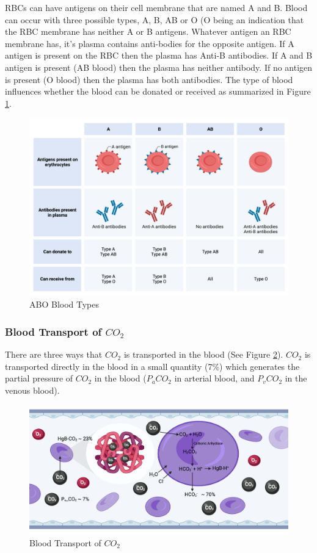 RBCs can have antigens on their cell membrane that are named A and B. Blood can occur with three possible types, A, B, AB or O (O being an indication that the RBC membrane has neither A or B antigens. Whatever antigen an RBC membrane has, it's plasma contains anti-bodies for the opposite antigen. If A antigen is present on the RBC then the plasma has Anti-B antibodies. If A and B antigen is present (AB blood) then the plasma has neither antibody. If no antigen is present (O blood) then the plasma has both antibodies. The type of blood influences whether the blood can be donated or received as summarized in Figure \ref{fig:ABO}.

\begin{figure}[!h]
    \centering
    \includegraphics[width=1.0\linewidth]{./figure/ABO.png}
    \caption{ABO Blood Types}
    \label{fig:ABO}
\end{figure}

\subsubsection{Blood Transport of $CO_2$}

There are three ways that $CO_2$ is transported in the blood (See Figure \ref{fig:co2_transport}). $CO_2$ is transported directly in the blood in a small quantity (7\%) which generates the partial pressure of $CO_2$ in the blood ($P_aCO_2$ in arterial blood, and $P_vCO_2$ in the venous blood). 

\begin{figure}[!h]
    \centering
    \includegraphics[width=1.0\linewidth]{./figure/co2_transport.png}
    \caption{Blood Transport of $CO_2$}
    \label{fig:co2_transport}
\end{figure}

